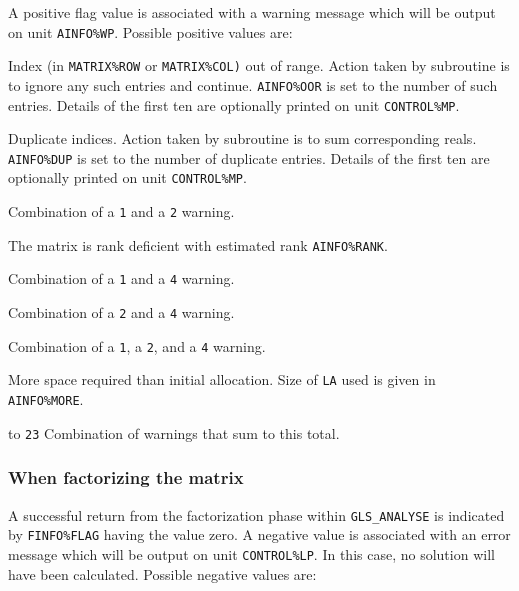 \documentclass{galahad}
\newcommand{\packagename}{GLS}
\begin{document}
\noindent
A positive flag value is associated with a warning message
which will  be output on unit {\tt AINFO\%WP}. Possible positive values are:
\begin{description}

 Index (in {\tt MATRIX\%ROW} or {\tt MATRIX\%COL)} out of range.
Action taken by subroutine is to ignore any such entries and
continue. {\tt AINFO\%OOR} is set to the number of such entries. Details
of the first ten are optionally printed on unit {\tt CONTROL\%MP}.

 Duplicate indices.
Action taken by subroutine is to sum corresponding reals.
{\tt AINFO\%DUP} is set to the number of duplicate entries.  Details of the
first ten are optionally printed on unit {\tt CONTROL\%MP}.

 Combination of a {\tt 1} and a {\tt 2} warning.

 The matrix is rank deficient with estimated rank {\tt AINFO\%RANK}.

 Combination of a {\tt 1} and a {\tt 4} warning.

 Combination of a {\tt 2} and a {\tt 4} warning.

 Combination of a {\tt 1}, a {\tt 2}, and a {\tt 4} warning.

 More space required than initial allocation.
Size of {\tt LA} used is given in {\tt AINFO\%MORE}.

 to {\tt 23} Combination of warnings that sum to this total.

\end{description}

\subsubsection{When factorizing the matrix} \label{errorf}

A successful return from the factorization phase within
{\tt \packagename\_ANALYSE}
is indicated by {\tt FINFO\%FLAG} having the value zero.
A negative value is associated with an error message which will be
output on unit {\tt CONTROL\%LP}. In this case, no solution will have
been calculated.  Possible negative values are:
\end{document}
